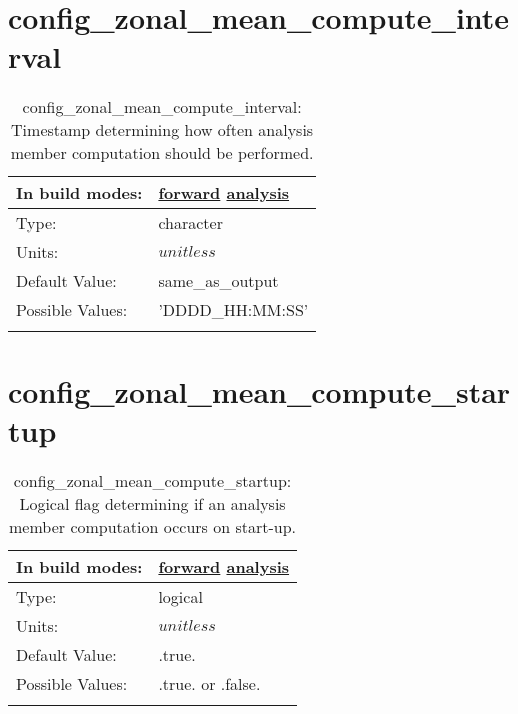 \section[config\_zonal\_mean\_compute\_interval]{config\_zonal\_mean\_compute\_interval}
\label{sec:nm_sec_config_zonal_mean_compute_interval}
\begin{center}
\begin{longtable}{| p{2.0in} || p{4.0in} |}
    \hline
    In build modes: & \hyperref[subsec:forward_nm_tab_zonal_mean]{forward} \hyperref[subsec:analysis_nm_tab_zonal_mean]{analysis} \\
    \hline
    Type: & character \\
    \hline
    Units: & $unitless$ \\
    \hline
    Default Value: & same\_as\_output \\
    \hline
    Possible Values: & 'DDDD\_HH:MM:SS' \\
    \hline
    \caption{config\_zonal\_mean\_compute\_interval: Timestamp determining how often analysis member computation should be performed.}
\end{longtable}
\end{center}
\section[config\_zonal\_mean\_compute\_startup]{config\_zonal\_mean\_compute\_startup}
\label{sec:nm_sec_config_zonal_mean_compute_startup}
\begin{center}
\begin{longtable}{| p{2.0in} || p{4.0in} |}
    \hline
    In build modes: & \hyperref[subsec:forward_nm_tab_zonal_mean]{forward} \hyperref[subsec:analysis_nm_tab_zonal_mean]{analysis} \\
    \hline
    Type: & logical \\
    \hline
    Units: & $unitless$ \\
    \hline
    Default Value: & .true. \\
    \hline
    Possible Values: & .true. or .false. \\
    \hline
    \caption{config\_zonal\_mean\_compute\_startup: Logical flag determining if an analysis member computation occurs on start-up.}
\end{longtable}
\end{center}

